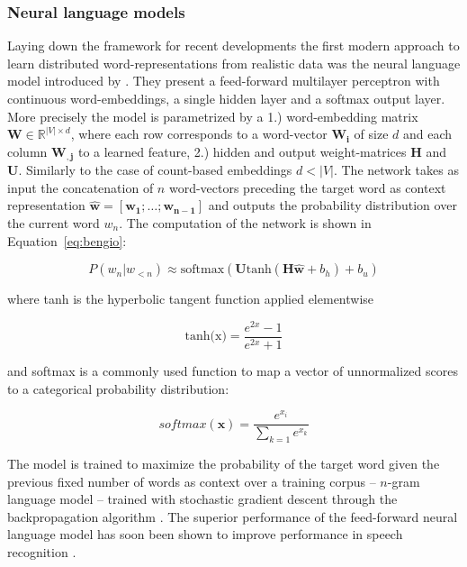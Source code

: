\subsubsection{Neural language models}
\label{sec:NNLM}
Laying down the framework for recent developments the first modern approach to learn
distributed word-representations from realistic data
was the neural language model introduced by \cite{bengio2003neural}.
They present a feed-forward multilayer perceptron with continuous word-embeddings,
a single hidden layer and a softmax output layer.
More precisely the model is parametrized by a 1.) word-embedding matrix
$\mathbf{W} \in \mathbb{R}^{|V| \times d}$, where each row corresponds to a word-vector
$\mathbf{W_i}$ of size $d$ and each column $\mathbf{W_{,j}}$ to a learned feature, 2.)
hidden and output weight-matrices $\mathbf{H}$ and $\mathbf{U}$. Similarly
to the case of count-based embeddings $d < |V|$.
The network takes as input the concatenation of $n$ word-vectors preceding the target word as context
representation $\hat{\mathbf{w}} = [\mathbf{w_1}; \ldots; \mathbf{w_{n-1}}]$
and outputs the probability distribution over the current word $w_n$.
The computation of the network is shown in Equation~\ref{eq:bengio}:

\begin{equation}
\label{eq:bengio}
P(w_n|w_{<n}) \approx \text{softmax}(\mathbf{U} \text{tanh}(\mathbf{H} \mathbf{\hat{w}} + b_h ) + b_u)
\end{equation}

where tanh is the hyperbolic tangent function applied elementwise

\begin{equation}
\label{eq:tanh}
\text{tanh(x)} = \frac{e^{2x} - 1 }{e^{2x} + 1 }
\end{equation}

and softmax is a commonly used function to map a vector of unnormalized scores to a
categorical probability distribution:

\begin{equation}
softmax(\mathbf{x}) = \frac{e^{x_{i}}}{\sum_{k=1} e^{x_k}}
\end{equation}

The model is trained to maximize the probability of
the target word given the previous fixed number of words as context over a training corpus
-- $n$-gram language model -- trained with stochastic gradient descent \citep{cauchy1847methode}
through the backpropagation algorithm \citep{rumelhart1985learning}.
The superior performance of the feed-forward neural language model has soon been shown to
improve performance in speech recognition \citep{schwenk2005training}.

